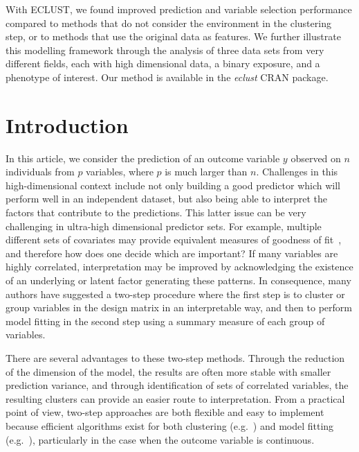 With ECLUST, we found improved prediction and variable selection performance compared to methods that do not consider the environment in the clustering step, or to methods that use the original data as features.  We further illustrate this modelling framework through the analysis of three data sets from very different fields, each with high dimensional data, a binary exposure, and a phenotype of interest. Our method is available in the \emph{eclust} CRAN package.

\newpage

\section{Introduction}
In this article, we consider the prediction of an outcome variable $y$ observed on $n$ individuals from $p$ variables, where $p$ is much larger than $n$. Challenges in this high-dimensional context include not only building a good predictor which will perform well in an independent dataset, but also being able to interpret the factors that contribute to the predictions. This latter issue can be very challenging in ultra-high dimensional predictor sets. For example, multiple different sets of covariates may provide equivalent measures of goodness of fit~\citep{fan2014challenges}, and therefore how does one decide which are important? If many variables are highly correlated, interpretation may be improved by acknowledging the existence of an underlying or latent factor generating these patterns. In consequence, many authors have suggested a two-step procedure where the first step is to cluster or group variables in the design matrix in an interpretable way, and then to perform  model fitting in the second step using a summary measure of each group of variables.

There are several advantages to these two-step methods.  Through the reduction of the dimension of the model, the results are often more stable with smaller prediction variance, and through identification of sets of correlated variables, the resulting clusters can provide an easier route to interpretation. From a practical point of view, two-step approaches are both flexible and easy to implement because efficient algorithms exist for both clustering (e.g.~\citep{fastclust}) and model fitting (e.g.~\citep{friedman2010regularization,gglasso,kuhn2008caret}), particularly in the case when the outcome variable is continuous. 

